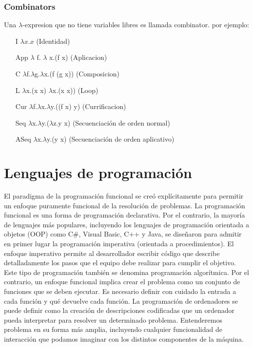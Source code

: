 \subsubsection{Combinators}
Una $\lambda$-expresion que no tiene variables libres es llamada 
combinator. por ejemplo:
\begin{itemize}
\item[I] $\lambda x.x$ (Identidad)
\item[App] $\lambda$ f. $\lambda$ x.(f x) (Aplicacion)
\item[C] $\lambda$f.$\lambda$g.$\lambda$x.(f (g x)) (Composicion)
\item[L] $\lambda$x.(x x) $\lambda$x.(x x)) (Loop)
\item[Cur] $\lambda$f.$\lambda$x.$\lambda$y.((f x) y) (Currificacion)
\item[Seq] $\lambda$x.$\lambda$y.($\lambda$z.y x) (Secuenciación de orden normal)
\item[ASeq] $\lambda$x.$\lambda$y.(y x) (Secuenciación de orden aplicativo)
\end{itemize}

\section{Lenguajes de programación}

El paradigma de la programación funcional se creó explícitamente para permitir un enfoque puramente funcional de la resolución de problemas. La programación funcional es una forma de programación declarativa. Por el contrario, la mayoría de lenguajes más populares, incluyendo los lenguajes de programación orientada a objetos (OOP) como C\#, Visual Basic, C++ y Java, se diseñaron para admitir en primer lugar la programación imperativa (orientada a procedimientos).
El enfoque imperativo permite al desarrollador escribir código que describe detalladamente los pasos que el equipo debe realizar para cumplir el objetivo. Este tipo de programación también se denomina programación algorítmica. Por el contrario, un enfoque funcional implica crear el problema como un conjunto de funciones que se deben ejecutar. Es necesario definir con cuidado la entrada a cada función y qué devuelve cada función. \cite{CompMic}
La programación de ordenadores se puede definir como la creación de descripciones codificadas que un ordenador pueda interpretar para resolver un determinado problema. Entenderemos problema en su forma más amplia, incluyendo cualquier funcionalidad de interacción que podamos imaginar con los distintos componentes de la máquina.

